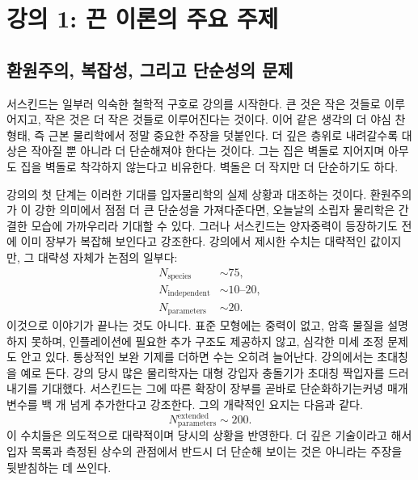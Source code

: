 \chapter{강의 1: 끈 이론의 주요 주제}


\section{환원주의, 복잡성, 그리고 단순성의 문제}

서스킨드는 일부러 익숙한 철학적 구호로 강의를 시작한다. 큰 것은 작은 것들로 이루어지고, 작은 것은 더 작은 것들로 이루어진다는 것이다. 이어 같은 생각의 더 야심 찬 형태, 즉 근본 물리학에서 정말 중요한 주장을 덧붙인다. 더 깊은 층위로 내려갈수록 대상은 작아질 뿐 아니라 더 단순해져야 한다는 것이다. 그는 집은 벽돌로 지어지며 아무도 집을 벽돌로 착각하지 않는다고 비유한다. 벽돌은 더 작지만 더 단순하기도 하다.

강의의 첫 단계는 이러한 기대를 입자물리학의 실제 상황과 대조하는 것이다. 환원주의가 이 강한 의미에서 점점 더 큰 단순성을 가져다준다면, 오늘날의 소립자 물리학은 간결한 모습에 가까우리라 기대할 수 있다. 그러나 서스킨드는 양자중력이 등장하기도 전에 이미 장부가 복잡해 보인다고 강조한다. 강의에서 제시한 수치는 대략적인 값이지만, 그 대략성 자체가 논점의 일부다:
\begin{equation}
\begin{aligned}
N_{\mathrm{species}}&\sim 75,\\
N_{\mathrm{independent}}&\sim 10\text{--}20,\\
N_{\mathrm{parameters}}&\sim 20.
\end{aligned}
\end{equation}
이것으로 이야기가 끝나는 것도 아니다. 표준 모형에는 중력이 없고, 암흑 물질을 설명하지 못하며, 인플레이션에 필요한 추가 구조도 제공하지 않고, 심각한 미세 조정 문제도 안고 있다. 통상적인 보완 기제를 더하면 수는 오히려 늘어난다. 강의에서는 초대칭을 예로 든다. 강의 당시 많은 물리학자는 대형 강입자 충돌기가 초대칭 짝입자를 드러내기를 기대했다. 서스킨드는 그에 따른 확장이 장부를 곧바로 단순화하기는커녕 매개변수를 백 개 넘게 추가한다고 강조한다. 그의 개략적인 요지는 다음과 같다.
\begin{equation}
N_{\mathrm{parameters}}^{\mathrm{extended}} \sim 200.
\end{equation}
이 수치들은 의도적으로 대략적이며 당시의 상황을 반영한다. 더 깊은 기술이라고 해서 입자 목록과 측정된 상수의 관점에서 반드시 더 단순해 보이는 것은 아니라는 주장을 뒷받침하는 데 쓰인다.

